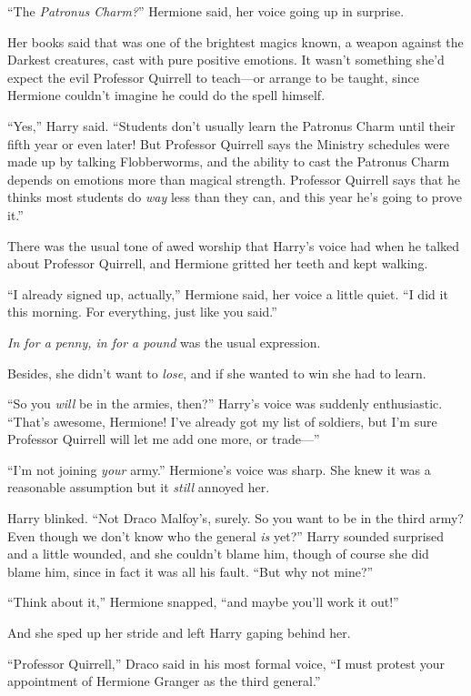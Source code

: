 “The \emph{Patronus Charm?}” Hermione said, her voice going up in surprise.

Her books said that was one of the brightest magics known, a weapon against the Darkest creatures, cast with pure positive emotions. It wasn’t something she’d expect the evil Professor Quirrell to teach—or arrange to be taught, since Hermione couldn’t imagine he could do the spell himself.

“Yes,” Harry said. “Students don’t usually learn the Patronus Charm until their fifth year or even later! But Professor Quirrell says the Ministry schedules were made up by talking Flobberworms, and the ability to cast the Patronus Charm depends on emotions more than magical strength. Professor Quirrell says that he thinks most students do \emph{way} less than they can, and this year he’s going to prove it.”

There was the usual tone of awed worship that Harry’s voice had when he talked about Professor Quirrell, and Hermione gritted her teeth and kept walking.

“I already signed up, actually,” Hermione said, her voice a little quiet. “I did it this morning. For everything, just like you said.”

\emph{In for a penny, in for a pound} was the usual expression.

Besides, she didn’t want to \emph{lose}, and if she wanted to win she had to learn.

“So you \emph{will} be in the armies, then?” Harry’s voice was suddenly enthusiastic. “That’s awesome, Hermione! I’ve already got my list of soldiers, but I’m sure Professor Quirrell will let me add one more, or trade—”

“I’m not joining \emph{your} army.” Hermione’s voice was sharp. She knew it was a reasonable assumption but it \emph{still} annoyed her.

Harry blinked. “Not Draco Malfoy’s, surely. So you want to be in the third army? Even though we don’t know who the general \emph{is} yet?” Harry sounded surprised and a little wounded, and she couldn’t blame him, though of course she did blame him, since in fact it was all his fault. “But why not mine?”

“Think about it,” Hermione snapped, “and maybe you’ll work it out!”

And she sped up her stride and left Harry gaping behind her.

\later

“Professor Quirrell,” Draco said in his most formal voice, “I must protest your appointment of Hermione Granger as the third general.”

